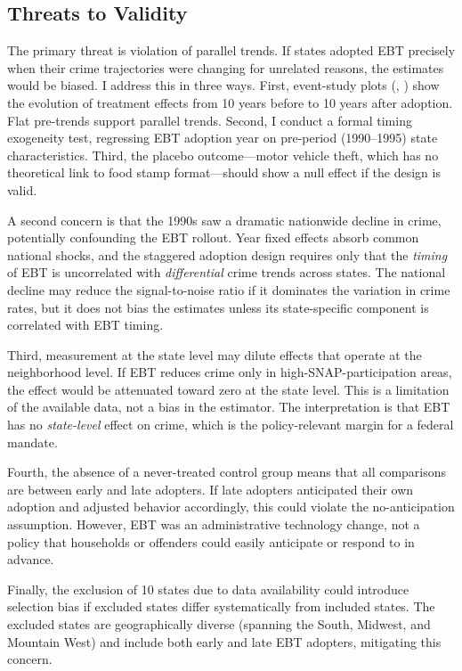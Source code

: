 \documentclass[12pt]{article}
\begin{document}
\subsection{Threats to Validity} \label{sec:threats}

The primary threat is violation of parallel trends. If states adopted EBT precisely when their crime trajectories were changing for unrelated reasons, the estimates would be biased. I address this in three ways. First, event-study plots (, ) show the evolution of treatment effects from 10 years before to 10 years after adoption. Flat pre-trends support parallel trends. Second, I conduct a formal timing exogeneity test, regressing EBT adoption year on pre-period (1990--1995) state characteristics. Third, the placebo outcome---motor vehicle theft, which has no theoretical link to food stamp format---should show a null effect if the design is valid.

A second concern is that the 1990s saw a dramatic nationwide decline in crime, potentially confounding the EBT rollout. Year fixed effects absorb common national shocks, and the staggered adoption design requires only that the \textit{timing} of EBT is uncorrelated with \textit{differential} crime trends across states. The national decline may reduce the signal-to-noise ratio if it dominates the variation in crime rates, but it does not bias the estimates unless its state-specific component is correlated with EBT timing.

Third, measurement at the state level may dilute effects that operate at the neighborhood level. If EBT reduces crime only in high-SNAP-participation areas, the effect would be attenuated toward zero at the state level. This is a limitation of the available data, not a bias in the estimator. The interpretation is that EBT has no \textit{state-level} effect on crime, which is the policy-relevant margin for a federal mandate.

Fourth, the absence of a never-treated control group means that all comparisons are between early and late adopters. If late adopters anticipated their own adoption and adjusted behavior accordingly, this could violate the no-anticipation assumption. However, EBT was an administrative technology change, not a policy that households or offenders could easily anticipate or respond to in advance.

Finally, the exclusion of 10 states due to data availability could introduce selection bias if excluded states differ systematically from included states. The excluded states are geographically diverse (spanning the South, Midwest, and Mountain West) and include both early and late EBT adopters, mitigating this concern.
\end{document}
